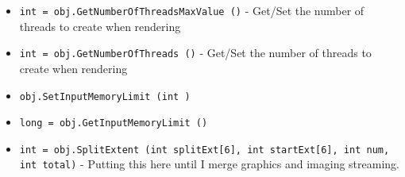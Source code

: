 \begin{itemize}
\item  \verb|int = obj.GetNumberOfThreadsMaxValue ()| -  Get/Set the number of threads to create when rendering

\item  \verb|int = obj.GetNumberOfThreads ()| -  Get/Set the number of threads to create when rendering

\item  \verb|obj.SetInputMemoryLimit (int )|

\item  \verb|long = obj.GetInputMemoryLimit ()|

\item  \verb|int = obj.SplitExtent (int splitExt[6], int startExt[6], int num, int total)| -  Putting this here until I merge graphics and imaging streaming.

\end{itemize}

